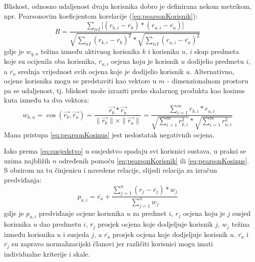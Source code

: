 \documentclass[times, utf8, diplomski, numeric]{fer}
\begin{document}
Bliskost, odnosno udaljenost dvaju korisnika dobro je definirana nekom metrikom,
npr. Pearsonovim koeficjentom korelacije (\ref{eq:pearsonKorisnik}):
\begin{equation}
\label{eq:pearsonKorisnik}
	R = \frac
			{\sum_{i \epsilon I} 
				\big[
					(r_{k,i} - \overline{r_k}) \ast
					(r_{u,i} - \overline{r_u})
				\big]
			}
			{
				\sqrt{{\sum_{i \epsilon I} (r_{k,i} - \overline{r_k})^2}} \ast 
				\sqrt{{\sum_{i \epsilon I} (r_{u,i} - \overline{r_u})^2}}
			}
\end{equation}
gdje je $w_{q,u}$ težina između aktivnog korisnika $k$ i korisnika $u$, $i$ skup
predmeta koje su ocijenila oba korisnika, $r_{u,i}$ ocjena koju je korisnik $u$
dodijelio predmetu $i$, a $\overline{r_u}$ srednja vrijednost svih ocjena koje
je dodijelio korisnik $u$.
Alternativno, ocjene korisnika mogu se predstaviti kao vektore u $m$ -
dimenzionalnom prostoru pa se udaljenost, tj. bliskost može izraziti preko
skalarnog produkta kao kosinus kuta između ta dva vektora:
\begin{equation}
\label{eq:pearsonKosinus}
	w_{k,u} = 
		\cos{(\vec{r_k}, \vec{r_u})} = 
		\frac
			{\vec{r_k} \ast \vec{r_u}}
			{\|\vec{r_k}\| \times \|\vec{r_u}\|} = 
		\frac
			{\sum_{i=1}^m r_{k,i} \ast r_{u,i}}
			{\sqrt{\sum_{i=1}^m r_{k,i}^2} \ast \sqrt{\sum_{i=1}^m r_{u,i}^2}}
\end{equation}
Mana pristupa \ref{eq:pearsonKosinus} jest nedostatak negativnih ocjena. 

Iako prema \ref{eq:susjedstvo} u susjedstvo spadaju svi korisnici sustava, u
praksi se uzima najbližih $n$ određenih pomoću \ref{eq:pearsonKorisnik} ili
\ref{eq:pearsonKosinus}. S obzirom na tu činjenicu i navedene relacije, slijedi
relacija za izračun predviđanja:
\begin{equation}
\label{eq:preduseruser}
	p_{u,i} =
		\overline{r_u}+
		\frac
			{\sum_{j = 1}^n (r_{j} - \overline{r_j}) \ast w_j}
			{\sum_{j = 1}^n w_j}
\end{equation}
gdje je $p_{u,i}$ predviđanje ocjene korisnika $u$ za predmet $i$, $r_j$ ocjena
koju je $j$ susjed korisnika $u$ dao predmetu $i$, $\overline{r_j}$ prosjek
ocjena koje dodjeljuje korisnik $j$, $w_j$ težina između korisnika $u$ i susjeda
$j$, a $\overline{r_u}$ prosjek ocjena koje dodjeljuje korisnik $u$.
$\overline{r_u}$ i $\overline{r_j}$ su zapravo normalizacijski članovi jer
različiti korisnici mogu imati individualne kriterije i skale. 
\end{document}

